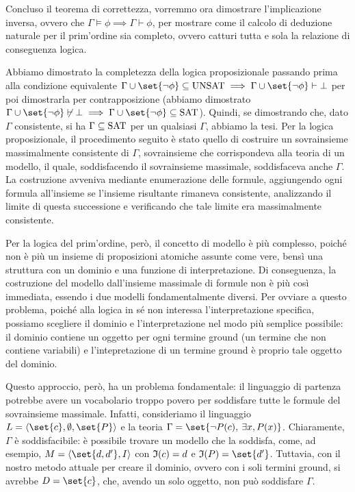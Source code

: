 Concluso il teorema di correttezza, vorremmo ora dimostrare l'implicazione inversa, ovvero che \(\Gamma \models \phi \implies \Gamma \vdash \phi\), per mostrare come il calcolo di deduzione naturale per il prim'ordine sia completo, ovvero catturi tutta e sola la relazione di conseguenza logica.

Abbiamo dimostrato la completezza della logica proposizionale passando prima alla condizione equivalente \(\Gamma \cup \set{\neg \phi} \subseteq \Unsat \implies \Gamma \cup \set{\neg \phi} \vdash \bot\) per poi dimostrarla per contrapposizione (abbiamo dimostrato \(\Gamma \cup \set{\neg \phi}\not\vdash \bot \implies \Gamma \cup \set{\neg \phi} \subseteq \Sat\)). Quindi, se dimostrando che, dato \(\Gamma\) consistente, si ha \(\Gamma \subseteq \Sat\) per un qualsiasi \(\Gamma\), abbiamo la tesi. 
Per la logica proposizionale, il procedimento seguito è stato quello di costruire un sovrainsieme massimalmente consistente di \(\Gamma\), sovrainsieme che corrispondeva alla teoria di un modello, il quale, soddisfacendo il sovrainsieme massimale, soddisfaceva anche \(\Gamma\). La costruzione avveniva mediante enumerazione delle formule, aggiungendo ogni formula all'insieme se l'insieme risultante rimaneva consistente, analizzando il limite di questa successione e verificando che tale limite era massimalmente consistente.

Per la logica del prim'ordine, però, il concetto di modello è più complesso, poiché non è più un insieme di proposizioni atomiche assunte come vere, bensì una struttura con un dominio e una funzione di interpretazione. Di conseguenza, la costruzione del modello dall'insieme massimale di formule non è più così immediata, essendo i due modelli fondamentalmente diversi. Per ovviare a questo problema, poiché alla logica in sé non interessa l'interpretazione specifica, possiamo scegliere il dominio e l'interpretazione nel modo più semplice possibile: il dominio contiene un oggetto per ogni termine ground (un termine che non contiene variabili) e l'intepretazione di un termine ground è proprio tale oggetto del dominio.

Questo approccio, però, ha un problema fondamentale: il linguaggio di partenza potrebbe avere un vocabolario troppo povero per soddisfare tutte le formule del sovrainsieme massimale. Infatti, consideriamo il linguaggio \(L=\langle \set{c}, \emptyset, \set{P}\rangle\) e la teoria \(\Gamma = \set{\neg P(c),\: \exists x, P(x)}\). Chiaramente, \(\Gamma\) è soddisfacibile: è possibile trovare un modello che la soddisfa, come, ad esempio, \(M = \langle \set{d,d'}, I\rangle\) con \(\mathfrak{I}(c) = d\) e \(\Interp(P) = \set{d'}\). Tuttavia, con il nostro metodo attuale per creare il dominio, ovvero con i soli termini ground, si avrebbe \(D=\set{c}\), che, avendo un solo oggetto, non può soddisfare \(\Gamma\). 

